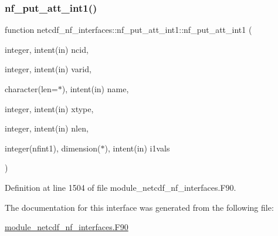 \subsubsection{\texorpdfstring{nf\+\_\+put\+\_\+att\+\_\+int1()}{nf\_put\_att\_int1()}}
{\footnotesize\ttfamily function netcdf\+\_\+nf\+\_\+interfaces\+::nf\+\_\+put\+\_\+att\+\_\+int1\+::nf\+\_\+put\+\_\+att\+\_\+int1 (\begin{DoxyParamCaption}\item[{integer, intent(in)}]{ncid,  }\item[{integer, intent(in)}]{varid,  }\item[{character(len=$\ast$), intent(in)}]{name,  }\item[{integer, intent(in)}]{xtype,  }\item[{integer, intent(in)}]{nlen,  }\item[{integer(nfint1), dimension($\ast$), intent(in)}]{i1vals }\end{DoxyParamCaption})}



Definition at line 1504 of file module\+\_\+netcdf\+\_\+nf\+\_\+interfaces.\+F90.



The documentation for this interface was generated from the following file\+:\begin{DoxyCompactItemize}
\item 
\hyperlink{module__netcdf__nf__interfaces_8F90}{module\+\_\+netcdf\+\_\+nf\+\_\+interfaces.\+F90}\end{DoxyCompactItemize}
